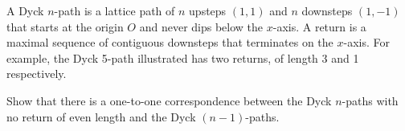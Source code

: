 A Dyck $n$-path is a lattice path of  $n$  upsteps $(1,1)$ and  $n$
  downsteps $(1,-1)$
that starts at the origin  $O$  and never dips below the  $x$-axis.
A return is a maximal sequence of contiguous downsteps that terminates
on the  $x$-axis. For example, the Dyck 5-path illustrated has two returns,
of length  3  and  1  respectively.
\begin{center}
\end{center}
Show that there is a one-to-one correspondence between the Dyck  $n$-paths
with no return of even length and the Dyck $(n-1)$-paths.
